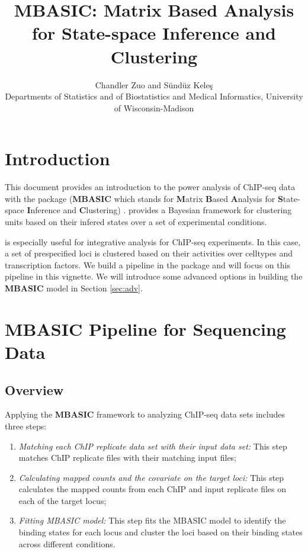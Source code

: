 \documentclass[a4paper,10pt]{article}\usepackage[]{graphicx}\usepackage[]{color}
\title{MBASIC: Matrix Based Analysis for State-space Inference and Clustering}
\author{Chandler Zuo and S\"und\"uz Kele\c{s}\\
  Departments of Statistics and of  Biostatistics and Medical Informatics, University of Wisconsin-Madison}
\date{}
\begin{document}
\maketitle

\tableofcontents

\section{Introduction}

This document provides an introduction to the power analysis of ChIP-seq data with the  package (\textbf{MBASIC} which stands for \textbf{M}atrix \textbf{B}ased \textbf{A}nalysis for \textbf{S}tate-space \textbf{I}nference and \textbf{C}lustering) \cite{zuo14}.  provides a Bayesian framework for clustering units based on their infered states over a set of experimental conditions.

 is especially useful for integrative analysis for ChIP-seq experiments. In this case, a set of prespecified loci is clustered based on their activities over celltypes and transcription factors. We build a pipeline in the  package and will focus on this pipeline in this vignette. We will introduce some advanced options in building the \textbf{MBASIC} model in Section \ref{sec:adv}.

\section{MBASIC Pipeline for Sequencing Data}

\subsection{Overview}

Applying the \textbf{MBASIC} framework to analyzing ChIP-seq data sets includes three steps:

\begin{enumerate}
\item \textit{Matching each ChIP replicate data set with their input data set:} This step matches ChIP replicate files with their matching input files;
\item \textit{Calculating mapped counts and the covariate on the target loci:} This step calculates the mapped counts from each ChIP and input replicate files on each of the target locus;
\item \textit{Fitting MBASIC model:} This step fits the MBASIC model to identify the binding states for each locus and cluster the loci based on their binding states across different conditions.
\end{enumerate}
\end{document}
